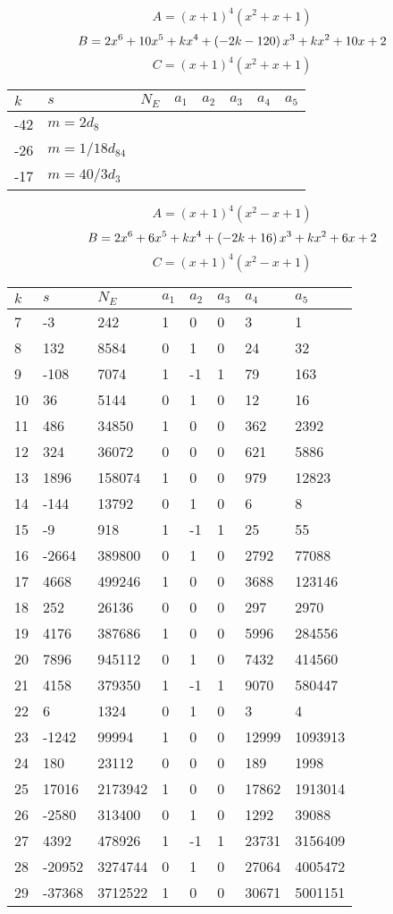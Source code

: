 \documentclass{amsart}
\begin{document}
$$A=(x
 + 1)^{4}(x^2
 + x
 + 1)$$
$$B=2\*x^6
 + 10\*x^5
 + k\*x^4
 + \left(-2\*k
 - 120\right) \*x^3
 + k\*x^2
 + 10\*x
 + 2$$
$$C=(x
 + 1)^{4}(x^2
 + x
 + 1)$$
\begin{longtable}{|l|l|l|lllll|}
\hline
$k$ & $s$ & $N_E$ & $a_1$ & $a_2$ & $a_3$ & $a_4$ & $a_5$\\
\hline
-42&$m=2d_{8}$&&\multicolumn{5}{c|}{}\\
-26&$m=1/18d_{84}$&&\multicolumn{5}{c|}{}\\
-17&$m=40/3d_{3}$&&\multicolumn{5}{c|}{}\\
\hline
\end{longtable}
$$A=(x
 + 1)^{4}(x^2
 - x
 + 1)$$
$$B=2\*x^6
 + 6\*x^5
 + k\*x^4
 + \left(-2\*k
 + 16\right) \*x^3
 + k\*x^2
 + 6\*x
 + 2$$
$$C=(x
 + 1)^{4}(x^2
 - x
 + 1)$$
\begin{longtable}{|l|l|l|lllll|}
\hline
$k$ & $s$ & $N_E$ & $a_1$ & $a_2$ & $a_3$ & $a_4$ & $a_5$\\
\hline
7&-3&242&1&0&0&3&1\\
8&132&8584&0&1&0&24&32\\
9&-108&7074&1&-1&1&79&163\\
10&36&5144&0&1&0&12&16\\
11&486&34850&1&0&0&362&2392\\
12&324&36072&0&0&0&621&5886\\
13&1896&158074&1&0&0&979&12823\\
14&-144&13792&0&1&0&6&8\\
15&-9&918&1&-1&1&25&55\\
16&-2664&389800&0&1&0&2792&77088\\
17&4668&499246&1&0&0&3688&123146\\
18&252&26136&0&0&0&297&2970\\
19&4176&387686&1&0&0&5996&284556\\
20&7896&945112&0&1&0&7432&414560\\
21&4158&379350&1&-1&1&9070&580447\\
22&6&1324&0&1&0&3&4\\
23&-1242&99994&1&0&0&12999&1093913\\
24&180&23112&0&0&0&189&1998\\
25&17016&2173942&1&0&0&17862&1913014\\
26&-2580&313400&0&1&0&1292&39088\\
27&4392&478926&1&-1&1&23731&3156409\\
28&-20952&3274744&0&1&0&27064&4005472\\
29&-37368&3712522&1&0&0&30671&5001151\\

\end{longtable}
\end{document}
